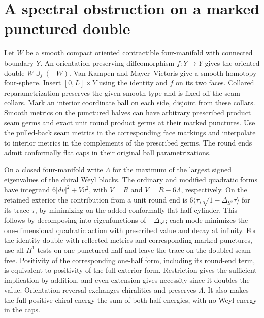 \section{A spectral obstruction on a marked punctured double}
\label{sec:marked-double-exterior}

Let \(W\) be a smooth compact oriented contractible four-manifold
with connected boundary \(Y\). An orientation-preserving diffeomorphism
\(f:Y\to Y\) gives the oriented double \(W\cup_f(-W)\).
Van Kampen and Mayer--Vietoris give a smooth homotopy four-sphere.
Insert \([0,L]\times Y\) using the identity and \(f\) on its two
faces. Collared reparametrization preserves the given smooth type
and is fixed off the seam collars. Mark an interior coordinate ball
on each side, disjoint from these collars. Smooth metrics on the
punctured halves can have arbitrary prescribed product seam
germs and exact unit round product germs at their marked
punctures. Use the pulled-back seam metrics in the corresponding
face markings and interpolate to interior metrics in the complements
of the prescribed germs. The round ends admit conformally flat
caps in their original ball parametrizations.

On a closed four-manifold write \(\Lambda\) for the maximum of
the largest signed eigenvalues of the chiral Weyl blocks. The
ordinary and modified quadratic forms have integrand
\(6|dv|^2+Vv^2\), with \(V=R\) and \(V=R-6\Lambda\),
respectively. On the retained exterior the contribution from a
unit round end is
\(6\langle\tau,\sqrt{1-\Delta_{S^3}}\tau\rangle\) for its trace
\(\tau\), by minimizing on the added conformally flat half
cylinder. This follows by decomposing into eigenfunctions of
\(-\Delta_{S^3}\); each mode minimizes the one-dimensional
quadratic action with prescribed value and decay at infinity.
For the identity double with reflected metrics and corresponding
marked punctures, use all \(H^1\) tests on one punctured half
and leave the trace on the doubled seam free. Positivity of
the corresponding one-half form, including its round-end term,
is equivalent to positivity of the full exterior form.
Restriction gives the sufficient implication by addition,
and even extension gives necessity since it doubles the value.
Orientation reversal exchanges chiralities and preserves
\(\Lambda\). It also makes the full positive chiral energy
the sum of both half energies, with no Weyl energy in the caps.

